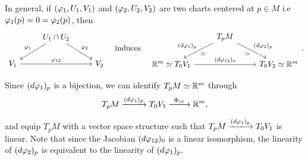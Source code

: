
In general, if \((\varphi_1,U_1,V_1)\) and \((\varphi_2,U_2,V_2)\) are two charts centered at \(p\in M\) i.e\ \(\varphi_1(p) = 0 = \varphi_2(p)\), then \[
    \begin{tikzcd}
    & U_1\cap U_2 \ar[']{dl}{\f_1} \ar{dr}{\f_2} & \\
    V_1 \ar{rr}{\f_{12}} && V_2
    \end{tikzcd}
    \quad\text{induces}\quad
    \begin{tikzcd}
    & T_pM \ar[']{dl}{(d\f_1)_p}[']{\simeq} \ar{dr}{(d\f_2)_p}[']{\simeq} & \\
    \R^m \simeq T_0V_1 \ar{rr}{(d\f_{12})_0} && T_0V_2 \simeq \R^m
    \end{tikzcd}.
  \]

Since \((d\varphi_1)_p\) is a bijection, we can identify \(T_p M\simeq\mathbb{R}^m\) through \[
    T_pM \xrightarrow[\hspace{2em}]{(d\varphi_1)_p} T_0V_1 \xrightarrow[\hspace{2em}]{\Phi_{\mathrm{id}}} \mathbb{R}^m,
\] and equip \(T_pM\) with a vector space structure such that \(T_pM\xlongrightarrow{(d\f_1)_p} T_0V_1\) is linear. Note that since the Jacobian \((d\varphi_{12})_0\) is a linear isomorphism, the linearity of \((d\varphi_2)_p\) is equivalent to the linearity of \((d\varphi_1)_p\).

